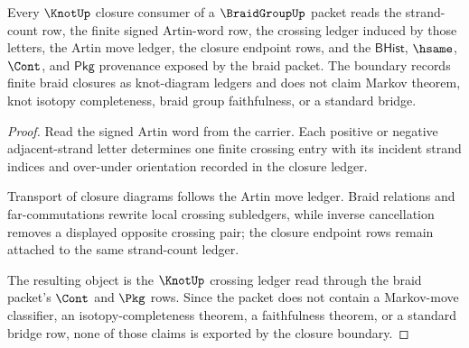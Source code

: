 \begin{theorem}
\label{thm:braidgroup-knot-closure-ledger-boundary}
Every $\KnotUp$ closure consumer of a $\BraidGroupUp$ packet reads the strand-count row, the finite signed Artin-word row, the crossing ledger induced by those letters, the Artin move ledger, the closure endpoint rows, and the $\mathsf{BHist}$, $\hsame$, $\Cont$, and $\mathsf{Pkg}$ provenance exposed by the braid packet. The boundary records finite braid closures as knot-diagram ledgers and does not claim Markov theorem, knot isotopy completeness, braid group faithfulness, or a standard bridge.
\end{theorem}
\begin{proof}
Read the signed Artin word from the carrier. Each positive or negative adjacent-strand letter determines one finite crossing entry with its incident strand indices and over-under orientation recorded in the closure ledger.

Transport of closure diagrams follows the Artin move ledger. Braid relations and far-commutations rewrite local crossing subledgers, while inverse cancellation removes a displayed opposite crossing pair; the closure endpoint rows remain attached to the same strand-count ledger.

The resulting object is the $\KnotUp$ crossing ledger read through the braid packet's $\Cont$ and $\Pkg$ rows. Since the packet does not contain a Markov-move classifier, an isotopy-completeness theorem, a faithfulness theorem, or a standard bridge row, none of those claims is exported by the closure boundary.
\end{proof}

